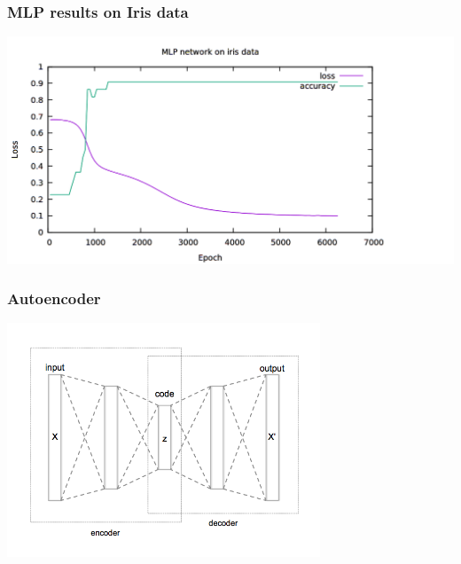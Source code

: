 \documentclass{beamer}
\begin{document}
\begin{frame}
\frametitle{MLP results on Iris data}
\begin{center}
	\includegraphics[width=\textwidth]{mlp_results}
\end{center}
\end{frame}



\begin{frame}
\frametitle{Autoencoder}
\begin{center}
	\includegraphics[width=0.7\textwidth]{Autoencoder_structure}
\end{center}
\end{frame}


\end{document}
